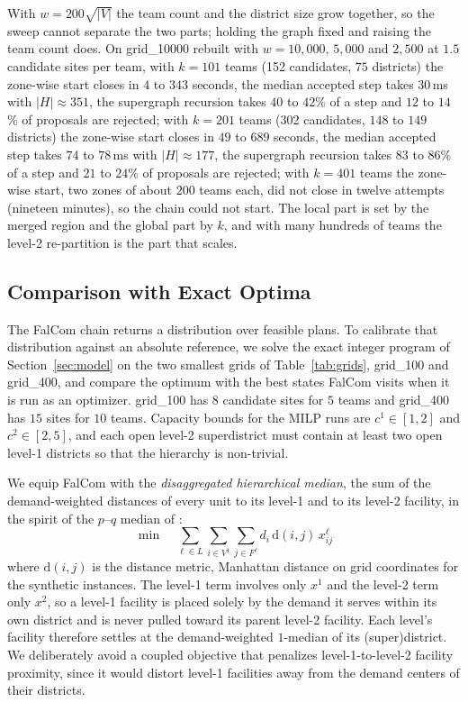 \documentclass[preprint,12pt,authoryear]{elsarticle}
\theoremstyle{definition}
\begin{document}
With $w = 200\sqrt{|V|}$ the team count and the district size grow together, so the sweep cannot separate the two parts; holding the graph fixed and raising the team count does. On grid\_10000 rebuilt with $w = 10{,}000$, $5{,}000$ and $2{,}500$ at $1.5$ candidate sites per team, with $k = 101$ teams (152 candidates, $75$ districts) the zone-wise start closes in $4$ to $343$ seconds, the median accepted step takes $30$\,ms with $|H| \approx 351$, the supergraph recursion takes $40$ to $42$\% of a step and $12$ to $14$\% of proposals are rejected; with $k = 201$ teams (302 candidates, $148$ to $149$ districts) the zone-wise start closes in $49$ to $689$ seconds, the median accepted step takes $74$ to $78$\,ms with $|H| \approx 177$, the supergraph recursion takes $83$ to $86$\% of a step and $21$ to $24$\% of proposals are rejected; with $k = 401$ teams the zone-wise start, two zones of about $200$ teams each, did not close in twelve attempts (nineteen minutes), so the chain could not start. The local part is set by the merged region and the global part by $k$, and with many hundreds of teams the level-2 re-partition is the part that scales.

\FloatBarrier
\subsection{Comparison with Exact Optima}\label{sec:exp-milp}

The FalCom chain returns a distribution over feasible plans. To calibrate that distribution against an absolute reference, we solve the exact integer program of Section~\ref{sec:model} on the two smallest grids of Table~\ref{tab:grids}, grid\_100 and grid\_400, and compare the optimum with the best states FalCom visits when it is run as an optimizer. grid\_100 has $8$ candidate sites for $5$ teams and grid\_400 has $15$ sites for $10$ teams. Capacity bounds for the MILP runs are $c^1 \in [1, 2]$ and $c^2 \in [2, 5]$, and each open level-2 superdistrict must contain at least two open level-1 districts so that the hierarchy is non-trivial.

We equip FalCom with the \emph{disaggregated hierarchical median}, the sum of the demand-weighted distances of every unit to its level-1 and to its level-2 facility, in the spirit of the $p$--$q$ median of \citet{serra1993pq}:
    \begin{equation}\label{eq:milp-median}
      \min \quad
      \sum_{\ell \in L} \sum_{i \in V^1} \sum_{j \in F^\ell}
        d_i \, \mathrm{d}(i, j) \, x^\ell_{ij}
    \end{equation}
    where $\mathrm{d}(i,j)$ is the distance metric, Manhattan distance on grid coordinates for the synthetic instances. The level-1 term involves only $x^1$ and the level-2 term only $x^2$, so a level-1 facility is placed solely by the demand it serves within its own district and is never pulled toward its parent level-2 facility. Each level's facility therefore settles at the demand-weighted $1$-median of its (super)district. We deliberately avoid a coupled objective that penalizes level-1-to-level-2 facility proximity, since it would distort level-1 facilities away from the demand centers of their districts.
\end{document}
